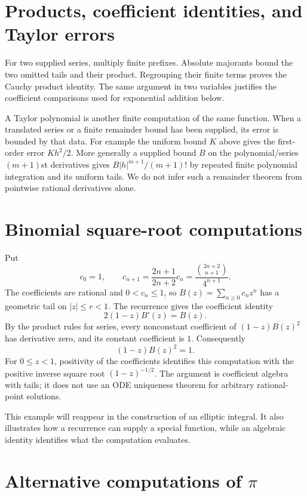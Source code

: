 \section{Products, coefficient identities, and Taylor errors}
For two supplied series, multiply finite prefixes.  Absolute majorants
bound the two omitted tails and their product.  Regrouping their finite
terms proves the Cauchy product identity.  The same argument in two
variables justifies the coefficient comparisons used for exponential
addition below.

A Taylor polynomial is another finite computation of the same function.
When a translated series or a finite remainder bound has been supplied,
its error is bounded by that data.  For example the uniform bound $K$
above gives the first-order error $K h^2/2$.  More generally a supplied
bound $B$ on the polynomial/series $(m+1)$st derivatives gives
$B|h|^{m+1}/(m+1)!$ by repeated finite polynomial integration and its
uniform tails.  We do not infer such a remainder theorem from pointwise
rational derivatives alone.

\section{Binomial square-root computations}
Put
\[
 c_0=1,\qquad c_{n+1}=\frac{2n+1}{2n+2}c_n
       =\frac{\binom{2n+2}{n+1}}{4^{n+1}}.
\]
The coefficients are rational and $0<c_n\le1$, so
$B(z)=\sum_{n\ge0}c_nz^n$ has a geometric tail on $|z|\le r<1$.
The recurrence gives the coefficient identity
\[
 2(1-z)B'(z)=B(z).
\]
By the product rules for series, every nonconstant coefficient of
$(1-z)B(z)^2$ has derivative zero, and its constant coefficient is $1$.
Consequently
\[
 (1-z)B(z)^2=1.
\]
For $0\le z<1$, positivity of the coefficients identifies this computation
with the positive inverse square root $(1-z)^{-1/2}$.  The argument is
coefficient algebra with tails; it does not use an ODE uniqueness theorem
for arbitrary rational-point solutions.

This example will reappear in the construction of an elliptic integral.
It also illustrates how a recurrence can supply a special function, while
an algebraic identity identifies what the computation evaluates.

\section{Alternative computations of $\pi$}\label{sec:alternative-pi-computations}

